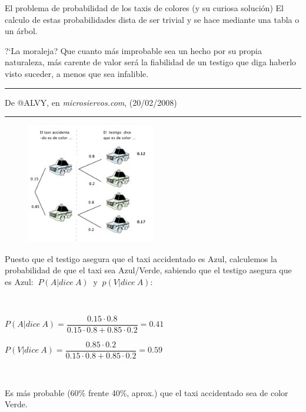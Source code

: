 \begin{myexampleblock} {El problema de probabilidad de los taxis de colores (y su curiosa solución)}
\vspace{2mm}El calculo de estas probabilidades dista de ser trivial y se hace mediante una tabla o un árbol. 

\vspace{2mm}?`La moraleja? Que cuanto más improbable sea un hecho por su propia naturaleza, más carente de valor será la fiabilidad de un testigo que diga haberlo visto suceder, a menos que sea infalible.


\rule{50mm}{0.1mm}

\begin{flushright}
	\begin{footnotesize}
		De @ALVY, en \emph{microsiervos.com}, (20/02/2008)
	\end{footnotesize}
\end{flushright}

\rule{100mm}{0.1mm}

\begin{multicols}{2}
	\begin{figure}[H]
			\centering
			\includegraphics[width=0.5\textwidth]{imagenes/imagenes02/T02IM47.png}
	\end{figure}
	Puesto que el testigo asegura que el taxi accidentado es Azul, calculemos la probabilidad de que el taxi sea Azul/Verde, sabiendo que el testigo asegura que es Azul: $\ P(A|dice\ A)\ $ y $\ p(V|dice \ A)$:
	
	$\quad$ 
	
	\begin{small}$ P(A|dice\ A)=\dfrac{0.15\cdot 0.8}{0.15\cdot 0.8 + 0.85\cdot 0.2}=\boldsymbol{0.41}$\end{small}
	
	\begin{small}$ P(V|dice\ A)=\dfrac{0.85\cdot 0.2}{0.15\cdot 0.8 + 0.85\cdot 0.2}=\boldsymbol{0.59}$\end{small}
	
	$\quad$ 
	
	Es más probable (60\% frente 40\%, aprox.) que el taxi accidentado sea de color Verde.
	
\end{multicols}


	
\end{myexampleblock}


